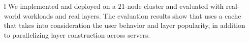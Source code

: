 %
%
l
%
We implemented and deployed \sysname on a 21-node cluster and evaluated with
real-world workloads and real layers.
%
The evaluation results show that
uses a cache that takes into consideration the user behavior and layer
popularity, in addition to parallelizing layer construction across %
servers.

